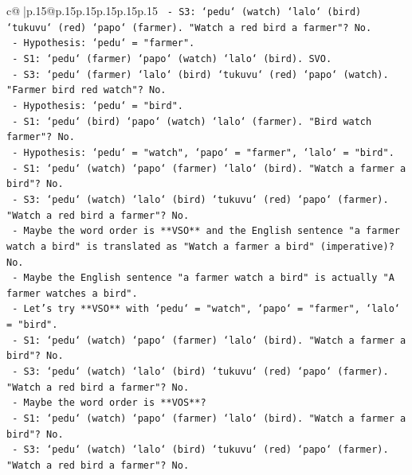 \documentclass{article}
\begin{document}
{\begin{supertabular}{c@{$\;$}|p{.15\linewidth}@{}p{.15\linewidth}p{.15\linewidth}p{.15\linewidth}p{.15\linewidth}p{.15\linewidth}}
{{{\texttt{                     {-} S3: `pedu` (watch) `lalo` (bird) `tukuvu` (red) `papo` (farmer). "Watch a red bird a farmer"? No.} \\
\texttt{                   {-} Hypothesis: `pedu` = "farmer".} \\
\texttt{                     {-} S1: `pedu` (farmer) `papo` (watch) `lalo` (bird). SVO.} \\
\texttt{                     {-} S3: `pedu` (farmer) `lalo` (bird) `tukuvu` (red) `papo` (watch). "Farmer bird red watch"? No.} \\
\texttt{                   {-} Hypothesis: `pedu` = "bird".} \\
\texttt{                     {-} S1: `pedu` (bird) `papo` (watch) `lalo` (farmer). "Bird watch farmer"? No.} \\
\texttt{                   {-} Hypothesis: `pedu` = "watch", `papo` = "farmer", `lalo` = "bird".} \\
\texttt{                     {-} S1: `pedu` (watch) `papo` (farmer) `lalo` (bird). "Watch a farmer a bird"? No.} \\
\texttt{                     {-} S3: `pedu` (watch) `lalo` (bird) `tukuvu` (red) `papo` (farmer). "Watch a red bird a farmer"? No.} \\
\texttt{                   {-} Maybe the word order is **VSO** and the English sentence "a farmer watch a bird" is translated as "Watch a farmer a bird" (imperative)? No.} \\
\texttt{                   {-} Maybe the English sentence "a farmer watch a bird" is actually "A farmer watches a bird".} \\
\texttt{                   {-} Let's try **VSO** with `pedu` = "watch", `papo` = "farmer", `lalo` = "bird".} \\
\texttt{                     {-} S1: `pedu` (watch) `papo` (farmer) `lalo` (bird). "Watch a farmer a bird"? No.} \\
\texttt{                     {-} S3: `pedu` (watch) `lalo` (bird) `tukuvu` (red) `papo` (farmer). "Watch a red bird a farmer"? No.} \\
\texttt{                   {-} Maybe the word order is **VOS**?} \\
\texttt{                     {-} S1: `pedu` (watch) `papo` (farmer) `lalo` (bird). "Watch a farmer a bird"? No.} \\
\texttt{                     {-} S3: `pedu` (watch) `lalo` (bird) `tukuvu` (red) `papo` (farmer). "Watch a red bird a farmer"? No.} \\
}}}
\end{supertabular}}
\end{document}
